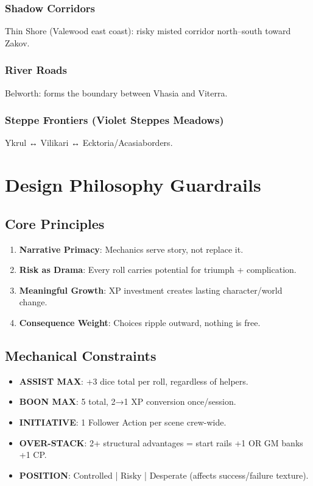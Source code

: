 \documentclass[11pt]{article}
\begin{document}
\subsubsection{Shadow Corridors}
Thin Shore (Valewood east coast): risky misted corridor north–south toward Zakov.

\subsubsection{River Roads}
Belworth: forms the boundary between Vhasia and Viterra.

\subsubsection{Steppe Frontiers (Violet Steppes Meadows)}
Ykrul ↔ Vilikari ↔ Ecktoria/Acasiaborders.

\section{Design Philosophy Guardrails}

\subsection{Core Principles}
\begin{enumerate}
    \item \textbf{Narrative Primacy}: Mechanics serve story, not replace it.
    \item \textbf{Risk as Drama}: Every roll carries potential for triumph + complication.
    \item \textbf{Meaningful Growth}: XP investment creates lasting character/world change.
    \item \textbf{Consequence Weight}: Choices ripple outward, nothing is free.
\end{enumerate}

\subsection{Mechanical Constraints}
\begin{itemize}
    \item \textbf{ASSIST MAX}: +3 dice total per roll, regardless of helpers.
    \item \textbf{BOON MAX}: 5 total, 2→1 XP conversion once/session.
    \item \textbf{INITIATIVE}: 1 Follower Action per scene crew-wide.
    \item \textbf{OVER-STACK}: 2+ structural advantages = start rails +1 OR GM banks +1 CP.
    \item \textbf{POSITION}: Controlled | Risky | Desperate (affects success/failure texture).
\end{itemize}
\end{document}

